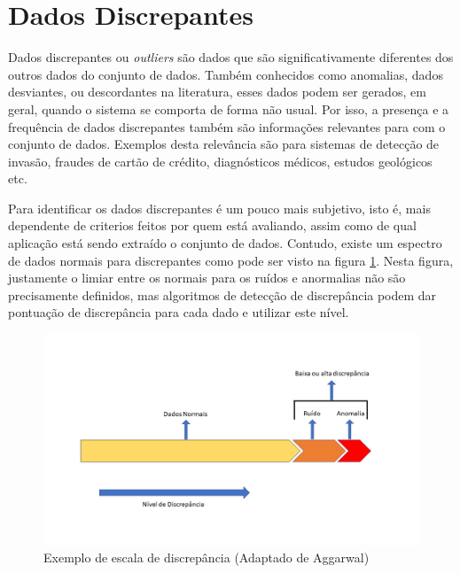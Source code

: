 \documentclass[
	12pt,				%
	openright,			%
	twoside,			%
	a4paper,			%
	english,			%
	brazil				%
	]{abntex2}
\begin{document}
	\section{Dados Discrepantes}
		Dados discrepantes ou \emph{outliers} são dados que são significativamente diferentes dos outros dados do conjunto de dados. \cite{Aggarwal2012}
		Também conhecidos como anomalias, dados desviantes, ou descordantes na literatura, esses dados podem ser gerados, em geral, quando o sistema se comporta de forma não usual. \cite{Aggarwal2012}
		Por isso, a presença e a frequência de dados discrepantes também são informações relevantes para com o conjunto de dados.
		Exemplos desta relevância são para sistemas de detecção de invasão, fraudes de cartão de crédito, diagnósticos médicos, estudos geológicos etc. \cite{Aggarwal2012}
		\par
		Para identificar os dados discrepantes é um pouco mais subjetivo, isto é, mais dependente de criterios feitos por quem está avaliando, assim como de qual aplicação está sendo extraído o conjunto de dados. \cite{Aggarwal2012}
		Contudo, existe um espectro de dados normais para discrepantes como pode ser visto na figura \ref{fig:Aggarwal}.
		Nesta figura, justamente o limiar entre os normais para os ruídos e anormalias não são precisamente definidos,
		mas algoritmos de detecção de discrepância podem dar pontuação de discrepância para cada dado e utilizar este nível. \cite{Aggarwal2012}

		\begin{figure}[h!]
			\centering
			\includegraphics[width=\linewidth]{./figures/FundamentacaoTeorica/ExemploDeDiscrepancia.png}
			\caption{Exemplo de escala de discrepância (Adaptado de Aggarwal) }
			\label{fig:Aggarwal}
		\end{figure}
		
\end{document}

